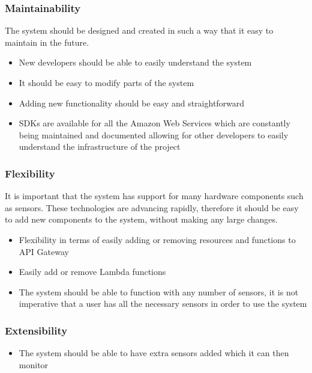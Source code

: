 \documentclass{article}
\begin{document}
\subsubsection{Maintainability}
The system should be designed and created in such a way that it easy to maintain in the future.
\begin{itemize}
	\item New developers should be able to easily understand the system
	\item It should be easy to modify parts of the system
	\item Adding new functionality should be easy and straightforward
	\item SDKs are available for all the Amazon Web Services which are constantly being maintained and documented allowing for other developers to easily understand the infrastructure of the project
\end{itemize}
\subsubsection{Flexibility}
It is important that the system has support for many hardware components such as sensors. These technologies are advancing rapidly, therefore it should be easy to add new components to the system, without making any large changes.

	\begin{itemize}
		\item Flexibility in terms of easily adding or removing resources and functions to API Gateway
		\item Easily add or remove Lambda functions
		\item The system should be able to function with any number of sensors, it is not imperative that a user has all the necessary sensors in order to use the system
	\end{itemize}
\subsubsection{Extensibility}
	\begin{itemize}
		\item The system should be able to have extra sensors added which it can then monitor
	\end{itemize}
\end{document}
